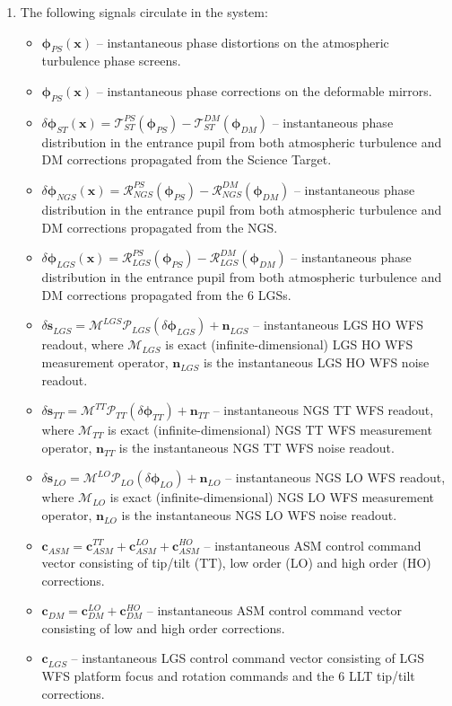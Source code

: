 \begin{enumerate}
	\item The following signals circulate in the system:
	\begin{itemize}
		\item $\bm{\phi}_{PS}^{}(\bm{x})$ -- instantaneous phase distortions on the
		atmospheric turbulence phase screens.
		\item $\bm{\phi}_{PS}^{}(\bm{x})$ -- instantaneous phase corrections on the
		deformable mirrors.
		\item $\delta \bm{\phi}_{ST}^{} (\bm{x}) = \mathcal{T}^{PS}_{ST}
		(\bm{\phi}_{PS}^{}) - \mathcal{T}^{DM}_{ST} (\bm{\phi}_{DM}^{})$
		-- instantaneous phase distribution in the entrance pupil from both
		atmospheric turbulence and DM corrections propagated from the Science
		Target.
		\item $\delta \bm{\phi}_{NGS}^{} (\bm{x}) = \mathcal{R}^{PS}_{NGS}
		(\bm{\phi}_{PS}^{}) - \mathcal{R}^{DM}_{NGS} (\bm{\phi}_{DM}^{})$
		-- instantaneous phase distribution in the entrance pupil from both
		atmospheric turbulence and DM corrections propagated from the NGS.
		\item $\delta \bm{\phi}_{LGS} (\bm{x}) = \mathcal{R}^{PS}_{LGS}
		(\bm{\phi}_{PS}^{}) - \mathcal{R}^{DM}_{LGS} (\bm{\phi}_{DM}^{})$
		-- instantaneous phase distribution in the entrance pupil from both
		atmospheric turbulence and DM corrections propagated from the 6 LGSs.
		\item $\delta \bm{s}_{LGS}^{} = \mathcal{M}^{LGS} \mathcal{P}_{LGS}
		(\delta \bm{\phi}_{LGS}^{}) + \bm{n}_{LGS}^{}$
		-- instantaneous LGS HO WFS readout, where $\mathcal{M}_{LGS}$ is exact
		(infinite-dimensional) LGS HO WFS measurement operator, $\bm{n}_{LGS}^{}$ is
		the instantaneous LGS HO WFS noise readout.
		\item $\delta \bm{s}_{TT}^{} = \mathcal{M}^{TT} \mathcal{P}_{TT}
		(\delta \bm{\phi}_{TT}^{}) + \bm{n}_{TT}^{}$
		-- instantaneous NGS TT WFS readout, where $\mathcal{M}_{TT}$ is exact
		(infinite-dimensional) NGS TT WFS measurement operator, $\bm{n}_{TT}^{}$ is
		the instantaneous NGS TT WFS noise readout.
		\item $\delta \bm{s}_{LO}^{} = \mathcal{M}^{LO} \mathcal{P}_{LO}
		(\delta \bm{\phi}_{LO}^{}) + \bm{n}_{LO}^{}$
		-- instantaneous NGS LO WFS readout, where $\mathcal{M}_{LO}$ is exact
		(infinite-dimensional) NGS LO WFS measurement operator, $\bm{n}_{LO}^{}$ is
		the instantaneous NGS LO WFS noise readout.
		\item $\bm{c}_{ASM}^{} = \bm{c}^{TT}_{ASM} + \bm{c}^{LO}_{ASM} +
		\bm{c}^{HO}_{ASM}$ -- instantaneous ASM control command vector consisting
		of tip/tilt (TT), low order (LO) and high order (HO) corrections.
		\item $\bm{c}_{DM}^{} = \bm{c}^{LO}_{DM} + \bm{c}^{HO}_{DM}$ --
		instantaneous
		ASM control command vector consisting of low and high order corrections.
		\item $\bm{c}_{LGS}^{}$ -- instantaneous LGS control command vector
		consisting of LGS WFS platform focus and rotation commands and the 6 LLT
		tip/tilt corrections.
	\end{itemize}
\end{enumerate}
